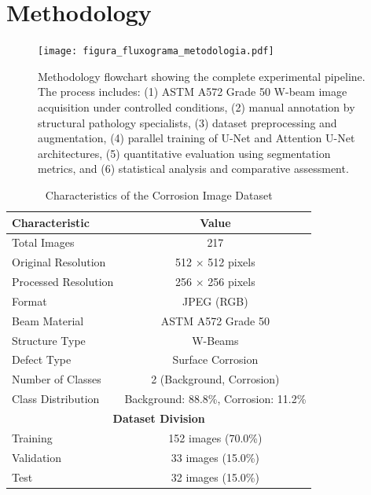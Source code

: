 \documentclass[12pt,a4paper,twoside]{article}
\begin{document}
\section{Methodology}

\begin{figure}[H]
    \centering
    \texttt{[image: figura\_fluxograma\_metodologia.pdf]}
    \caption{Methodology flowchart showing the complete experimental pipeline. The process includes: (1) ASTM A572 Grade 50 W-beam image acquisition under controlled conditions, (2) manual annotation by structural pathology specialists, (3) dataset preprocessing and augmentation, (4) parallel training of U-Net and Attention U-Net architectures, (5) quantitative evaluation using segmentation metrics, and (6) statistical analysis and comparative assessment.}
    \label{fig:methodology_flowchart}
\end{figure}

\begin{table}[htbp]
\centering
\caption{Characteristics of the Corrosion Image Dataset}
\label{tab:dataset_characteristics}
\begin{tabular}{|l|c|}
\hline
\textbf{Characteristic} & \textbf{Value} \\
\hline
Total Images & 217 \\
\hline
Original Resolution & 512 × 512 pixels \\
\hline
Processed Resolution & 256 × 256 pixels \\
\hline
Format & JPEG (RGB) \\
\hline
Beam Material & ASTM A572 Grade 50 \\
\hline
Structure Type & W-Beams \\
\hline
Defect Type & Surface Corrosion \\
\hline
Number of Classes & 2 (Background, Corrosion) \\
\hline
Class Distribution & Background: 88.8\%, Corrosion: 11.2\% \\
\hline
\multicolumn{2}{|c|}{\textbf{Dataset Division}} \\
\hline
Training & 152 images (70.0\%) \\
\hline
Validation & 33 images (15.0\%) \\
\hline
Test & 32 images (15.0\%) \\
\hline
\end{tabular}
\end{table}


\label{sec:methodology}
\end{document}
